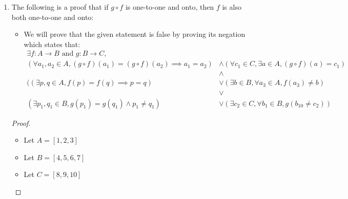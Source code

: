\documentclass[12pt]{article}
\theoremstyle{definition}
\begin{document}
\begin{enumerate}
\begin{enumerate}[i]
\begin{proof}
\begin{itemize}
\begin{align*}
                        &= (g \circ f)(a) \tag{From the definition of function composition} \\
                        &= c \tag{using assumption that $g \circ f$ is onto}
                    \end{align*}
                \end{itemize}
            \end{proof}
            \item The following is a proof that if $g \circ f$ is one-to-one and onto, then $f$ is also both one-to-one and onto:
            \begin{itemize}
                \item We will prove that the given statement is false by proving its  negation which states that:
                 \begin{align*}
                    \exists f: A \rightarrow B \text{ and } g: B \rightarrow C, \\
                    ( \forall a_1, a_2 \in A, (g \circ f)(a_1) =  (g \circ f)(a_2) \implies a_1 = a_2 ) &\land (\forall c_1 \in C, \exists a \in A, (g\circ f)(a) = c_1)\\ 
                    &\land \\ 
                    ((\exists p,q \in A, f(p) = f(q) \implies p=q) &\lor (\exists b \in B, \forall a_3 \in A, f(a_3) \neq b) \\
                    &\lor \\
                    (\exists p_1, q_1 \in B, g(p_1) = g(q_1) \land p_1 \neq q_1) &\lor (\exists c_2 \in C, \forall b_1 \in B, g(b_10 \neq  c_2)) 
                \end{align*} 
                \end{itemize}
            \begin{proof} $ $\newline
    \begin{itemize} 
    \item Let $A=[1,2,3]$
    \item Let $B=[4,5,6,7]$
    \item Let $C=[8,9,10]$ 
\end{itemize}


\end{proof}
\end{enumerate}
\end{enumerate}
\end{document}
